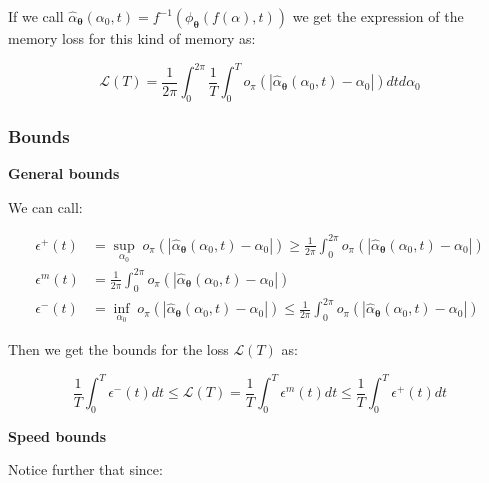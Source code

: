 \documentclass{article} %
\newcounter{ct}
\theoremstyle{definition}
\theoremstyle{remark}
\begin{document}
If we call $\hat{\alpha}_{\boldsymbol{\theta}}(\alpha_0, t) = f^{-1}(\phi_{\bm{\theta}}(f(\alpha),t))$ we get the expression of the memory loss for this kind of memory as:

\begin{equation}
    \mathcal{L}(T) =  \frac{1}{2 \pi} \int_0^{2 \pi}  \frac{1}{T} \int_0^T o_\pi \left( \left| \hat{\alpha}_{\boldsymbol{\theta}}(\alpha_0, t) - \alpha_0  \right| \right) dt d\alpha_0
\end{equation}

\subsubsection{Bounds}

\textbf{General bounds}

We can call:

\begin{equation}
\begin{split}
    \epsilon^+(t) &= \sup_{\alpha_0} \; o_\pi \left( \left| \hat{\alpha}_{\boldsymbol{\theta}}(\alpha_0, t) - \alpha_0  \right| \right) \geq \frac{1}{2 \pi} \int_0^{2 \pi}  o_\pi \left( \left| \hat{\alpha}_{\boldsymbol{\theta}}(\alpha_0, t) - \alpha_0  \right| \right)  \\
     \epsilon^{m}(t) &= \frac{1}{2 \pi} \int_0^{2 \pi}  o_\pi \left( \left| \hat{\alpha}_{\boldsymbol{\theta}}(\alpha_0, t) - \alpha_0  \right| \right) \\
    \epsilon^-(t) &= \inf_{\alpha_0} \; o_\pi \left( \left| \hat{\alpha}_{\boldsymbol{\theta}}(\alpha_0, t) - \alpha_0  \right| \right) \leq \frac{1}{2 \pi} \int_0^{2 \pi}  o_\pi \left( \left| \hat{\alpha}_{\boldsymbol{\theta}}(\alpha_0, t) - \alpha_0  \right| \right)
\end{split}
\end{equation}

Then we get the bounds for the loss $\mathcal{L}(T)$ as:

\begin{equation}
    \frac{1}{T} \int_0^{T} \epsilon^-(t)dt \leq \mathcal{L}(T) = \frac{1}{T} \int_0^{T} \epsilon^{m}(t) dt \leq  \frac{1}{T} \int_0^{T} \epsilon^+(t) dt
\end{equation}


\textbf{Speed bounds}

Notice further that since:
\end{document}
